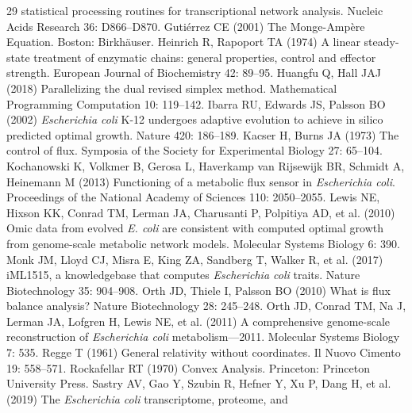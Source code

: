 \begin{thebibliography}{29}
             statistical processing routines for transcriptional network
             analysis. Nucleic Acids Research 36: D866--D870.
Guti{\'e}rrez CE (2001) The Monge-Amp{\`e}re Equation. Boston: Birkh{\"a}user.
Heinrich R, Rapoport TA (1974) A linear steady-state treatment of enzymatic chains: general
             properties, control and effector strength. European Journal of Biochemistry 42: 89--95.
Huangfu Q, Hall JAJ (2018) Parallelizing the dual revised simplex method. Mathematical Programming Computation 10: 119--142.
Ibarra RU, Edwards JS, Palsson BO (2002) \emph{Escherichia coli} {K-12} undergoes adaptive evolution to
             achieve in silico predicted optimal growth. Nature 420: 186--189.
Kacser H, Burns JA (1973) The control of flux. Symposia of the Society for Experimental Biology 27: 65--104.
Kochanowski K, Volkmer B, Gerosa L, Haverkamp van Rijsewijk BR, Schmidt A, Heinemann M (2013) Functioning of a metabolic flux sensor in \emph{Escherichia
             coli}. Proceedings of the National Academy of Sciences 110: 2050--2055.
Lewis NE, Hixson KK, Conrad TM, Lerman JA, Charusanti P, Polpitiya AD, et al. (2010) Omic data from evolved \emph{E. coli} are consistent with
             computed optimal growth from genome-scale metabolic network
             models. Molecular Systems Biology 6: 390.
Monk JM, Lloyd CJ, Misra E, King ZA, Sandberg T, Walker R, et al. (2017) i{ML1515}, a knowledgebase that computes \emph{Escherichia
             coli} traits. Nature Biotechnology 35: 904--908.
Orth JD, Thiele I, Palsson BO (2010) What is flux balance analysis? Nature Biotechnology 28: 245--248.
Orth JD, Conrad TM, Na J, Lerman JA, Lofgren H, Lewis NE, et al. (2011) A comprehensive genome-scale reconstruction of \emph{Escherichia coli} metabolism---2011. Molecular Systems Biology 7: 535.
Regge T (1961) General relativity without coordinates. Il Nuovo Cimento 19: 558--571.
Rockafellar RT (1970) Convex Analysis. Princeton: Princeton University Press.
Sastry AV, Gao Y, Szubin R, Hefner Y, Xu P, Dang H, et al. (2019) The \emph{Escherichia coli} transcriptome, proteome, and

\end{thebibliography}
